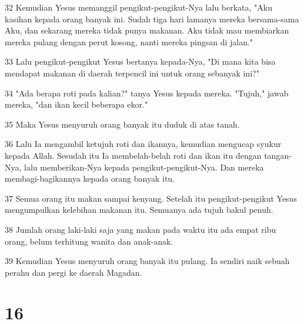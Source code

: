 \par 32 Kemudian Yesus memanggil pengikut-pengikut-Nya lalu berkata, "Aku kasihan kepada orang banyak ini. Sudah tiga hari lamanya mereka bersama-sama Aku, dan sekarang mereka tidak punya makanan. Aku tidak mau membiarkan mereka pulang dengan perut kosong, nanti mereka pingsan di jalan."
\par 33 Lalu pengikut-pengikut Yesus bertanya kepada-Nya, "Di mana kita bisa mendapat makanan di daerah terpencil ini untuk orang sebanyak ini?"
\par 34 "Ada berapa roti pada kalian?" tanya Yesus kepada mereka. "Tujuh," jawab mereka, "dan ikan kecil beberapa ekor."
\par 35 Maka Yesus menyuruh orang banyak itu duduk di atas tanah.
\par 36 Lalu Ia mengambil ketujuh roti dan ikannya, kemudian mengucap syukur kepada Allah. Sesudah itu Ia membelah-belah roti dan ikan itu dengan tangan-Nya, lalu memberikan-Nya kepada pengikut-pengikut-Nya. Dan mereka membagi-bagikannya kepada orang banyak itu.
\par 37 Semua orang itu makan sampai kenyang. Setelah itu pengikut-pengikut Yesus mengumpulkan kelebihan makanan itu. Semuanya ada tujuh bakul penuh.
\par 38 Jumlah orang laki-laki saja yang makan pada waktu itu ada empat ribu orang, belum terhitung wanita dan anak-anak.
\par 39 Kemudian Yesus menyuruh orang banyak itu pulang. Ia sendiri naik sebuah perahu dan pergi ke daerah Magadan.

\chapter{16}

